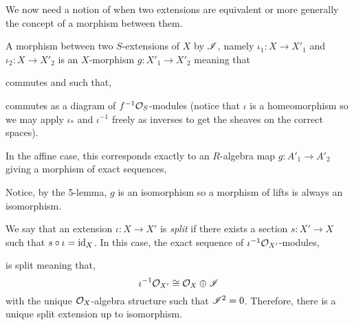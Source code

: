 \documentclass[12pt]{article}
\begin{document}
\begin{rmk}
We now need a notion of when two extensions are equivalent or more generally the concept of a morphism between them.
\end{rmk}

\begin{defn}
A morphism between two $S$-extensions of $X$ by $\mathscr{I}$, namely $\iota_1 : X \to X'_1$ and $\iota_2 : X \to X'_2$ is an $X$-morphism $g : X'_1 \to X'_2$ meaning that
\begin{center}
\end{center}
commutes and such that,
\begin{center}
\end{center}
commutes as a diagram of $f^{-1} \mathcal{O}_{S}$-modules (notice that $\iota$ is a homeomorphism so we may apply $\iota_*$ and $\iota^{-1}$ freely as inverses to get the sheaves on the correct spaces).
\end{defn}

\begin{rmk}
In the affine case, this corresponds exactly to an $R$-algebra map $g : A'_1 \to A'_2$ giving a morphism of exact sequences,
\begin{center}
\end{center}
Notice, by the 5-lemma, $g$ is an isomorphism so a morphism of lifts is always an isomorphism.
\end{rmk}

\begin{defn}
We say that an extension $\iota : X \to X'$ is \textit{split} if there exists a section $s : X' \to X$ such that $s \circ \iota = \mathrm{id}_X$. In this case, the exact sequence of $\iota^{-1} \mathcal{O}_{X'}$-modules,
\begin{center}
\end{center}
is split meaning that,
\[ \iota^{-1} \mathcal{O}_{X'} \cong \mathcal{O}_{X} \oplus \mathscr{I} \]
with the unique $\mathcal{O}_{X}$-algebra structure such that $\mathscr{I}^2 = 0$. Therefore, there is a unique split extension up to isomorphism.
\end{defn}
\end{document}
